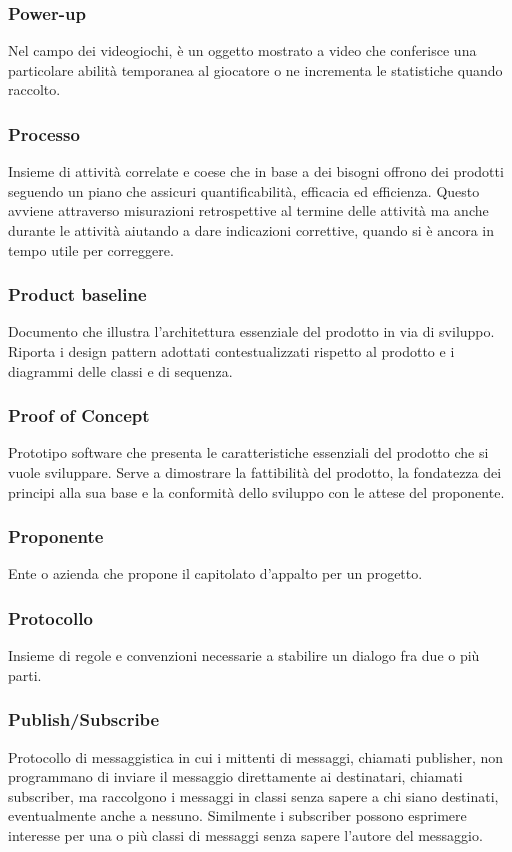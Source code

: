 \subsubsection*{Power-up} Nel campo dei videogiochi, è un oggetto mostrato a video che conferisce una particolare abilità temporanea al giocatore o ne incrementa le statistiche quando raccolto.
\subsubsection*{Processo} Insieme di attività correlate e coese che in base a dei bisogni offrono dei prodotti seguendo un piano che assicuri quantificabilità, efficacia ed efficienza. Questo avviene attraverso misurazioni retrospettive al termine delle attività ma anche durante le attività aiutando a dare indicazioni correttive, quando si è ancora in tempo utile per correggere.
\subsubsection*{Product baseline} Documento che illustra l'architettura essenziale del prodotto in via di sviluppo. \\
Riporta i design pattern adottati contestualizzati rispetto al prodotto e i diagrammi delle classi e di sequenza.
\subsubsection*{Proof of Concept} Prototipo software che presenta le caratteristiche essenziali del prodotto che si vuole sviluppare. Serve a dimostrare la fattibilità del prodotto, la fondatezza dei principi alla sua base e la conformità dello sviluppo con le attese del proponente.
\subsubsection*{Proponente} Ente o azienda che propone il capitolato d’appalto per un progetto.
\subsubsection*{Protocollo} Insieme di regole e convenzioni necessarie a stabilire un dialogo fra due o più parti.
\subsubsection*{Publish/Subscribe} Protocollo di messaggistica in cui i mittenti di messaggi, chiamati publisher, non programmano di inviare il messaggio direttamente ai destinatari, chiamati subscriber, ma raccolgono i messaggi in classi senza sapere a chi siano destinati, eventualmente anche a nessuno. Similmente i subscriber possono esprimere interesse per una o più classi di messaggi senza sapere l'autore del messaggio.
